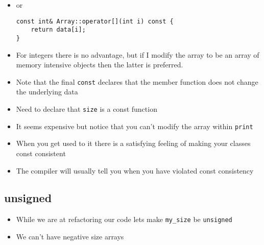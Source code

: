 \documentclass[11pt]{article}
\begin{document}
\begin{itemize}
\item or
\begin{verbatim}
const int& Array::operator[](int i) const {
    return data[i];
}
\end{verbatim}
\item For integers there is no advantage, but if I modify the array to be
an array of memory intensive objects then the latter is preferred.
\item Note that the final \texttt{const} declares that the member function does
not change the underlying data
\item Need to declare that \texttt{size} is a const function
\item It seems expensive but notice that you can't modify the array within \texttt{print}
\item When you get used to it there is a satisfying feeling of making your
classes const consistent
\item The compiler will usually tell you when you have violated const consistency
\end{itemize}

\subsection{unsigned}
\label{sec:org277a5de}
\begin{itemize}
\item While we are at refactoring our code lets make \texttt{my\_size} be \texttt{unsigned}
\item We can't have negative size arrays
\end{itemize}
\end{document}

